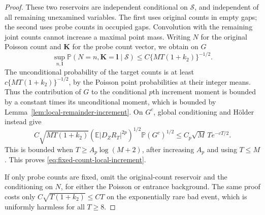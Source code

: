 \documentclass[11pt,letterpaper]{article}
\newcommand{\PP}{\mathbb P}\newcommand{\EE}{\mathbb E}
\begin{document}
\begin{proof}
These two reservoirs are independent conditional on
$\mathcal S$, and independent of all remaining unexamined
variables. The first uses original counts in empty gaps;
the second uses probe counts in occupied gaps. Convolution
with the remaining joint counts cannot increase a maximal
point mass. Writing $N$ for the original Poisson count and
$\boldsymbol K$ for the probe count vector, we obtain on $G$
\begin{equation}\label{eq:joint-reservoir-point-bound}
 \sup_{n,\boldsymbol l}
 \PP(N=n,\boldsymbol K=\boldsymbol l\mid\mathcal S)
                \le C\{MT(1+k_2)\}^{-1/2}.
\end{equation}
The unconditional probability of the target counts is at
least $c\{MT(1+k_2)\}^{-1/2}$, by the Poisson point probabilities
at their integer means. Thus the contribution of $G$ to the
conditional $p$th increment moment is bounded by a constant
times its unconditional moment, which is bounded by
Lemma~\ref{lem:local-remainder-increment}. On $G^c$, global
conditioning and H\"older instead give
\[
 C\sqrt{MT(1+k_2)}
   (\EE|D_ZR_T|^{2p})^{1/2}\PP(G^c)^{1/2}
       \le C_p\sqrt M\,T e^{-cT/2}.
\]
This is bounded when $T\ge A_p\log(M+2)$, after increasing
$A_p$ and using $T\le M$. This proves
\eqref{eq:fixed-count-local-increment}.

If only probe counts are fixed, omit the original-count
reservoir and the conditioning on $N$, for either the Poisson
or entrance background. The same proof costs
only $C\sqrt{T(1+k_2)}\le CT$ on the exponentially rare bad event, which is
uniformly harmless for all $T\ge8$.
\end{proof}
\end{document}
